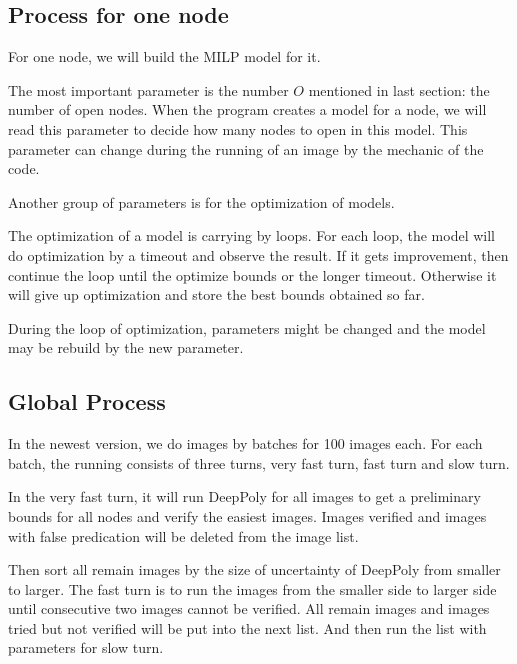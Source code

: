 \documentclass{llncs}
\begin{document}
\subsection{Process for one node}

For one node, we will build the MILP model for it.

The most important parameter is the number $O$ mentioned in last section:  the number of open nodes. When the program creates a model for a node, we will read this parameter to decide how many nodes to open in this model. This parameter can change during the running of an image by the mechanic of the code.


Another group of parameters is for the optimization of models. 

The optimization of a model is carrying by loops. For each loop, the model will do optimization by a timeout and observe the result. If it gets improvement, then continue the loop until the optimize bounds or the longer timeout. Otherwise it will give up optimization and store the best bounds obtained so far.  

During the loop of optimization, parameters might be changed and the model may be rebuild by the new parameter.


\subsection{Global Process}

In the newest version, we do images by batches for 100 images each. For each batch, the running consists of three turns, very fast turn, fast turn and slow turn.

In the very fast turn, it will run DeepPoly for all images to get a preliminary bounds for all nodes and verify the easiest images. Images verified and images with false predication will be deleted from the image list.

Then sort all remain images by the size of uncertainty of DeepPoly from smaller to larger. The fast turn is to run the images from the smaller side to larger side until consecutive two images cannot be verified. All remain images and images tried but not verified will be put into the next list. And then run the list with parameters for slow turn.
\end{document}
